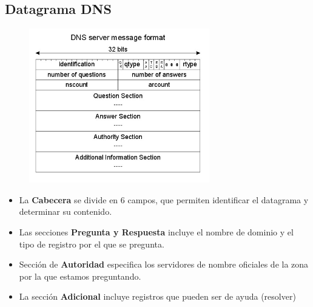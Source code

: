 \subsection{Datagrama DNS}
\begin{figure}[H]\centering\includegraphics[width=0.7\textwidth]{img/DNS_Datagram.jpg}
\end{figure}
\begin{itemize}
    \item La \textbf{Cabecera} se divide en 6 campos, que permiten identificar el datagrama y determinar su contenido.
    \item Las secciones \textbf{Pregunta y Respuesta} incluye el nombre de dominio y el tipo de registro por el que se pregunta.
    \item Sección de \textbf{Autoridad} especifica los servidores de nombre oficiales de la zona por la que estamos preguntando.
    \item La sección \textbf{Adicional} incluye registros que pueden ser de ayuda (resolver)
\end{itemize}
